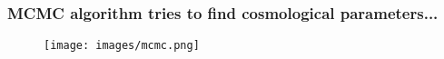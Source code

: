 \begin{frame}
\frametitle{MCMC algorithm tries to find cosmological parameters...}

\begin{figure}
	\texttt{[image: images/mcmc.png]}
\end{figure}

\end{frame}

